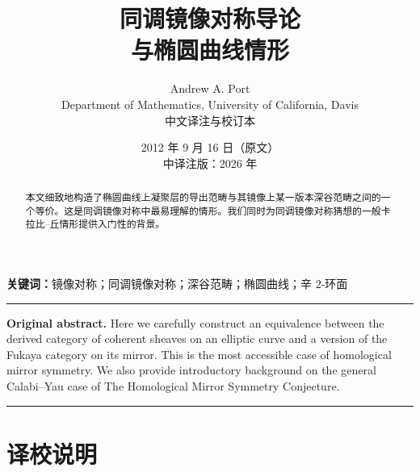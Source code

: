\documentclass[11pt,a4paper]{article}
\theoremstyle{plain}
\theoremstyle{definition}
\begin{document}
\title{\bfseries 同调镜像对称导论\\[4pt] 与椭圆曲线情形}
\author{Andrew A. Port\\[2pt]
        \small Department of Mathematics, University of California, Davis\\[6pt]
        \small 中文译注与校订本}
\date{2012 年 9 月 16 日（原文）\\[2pt] 中译注版：2026 年}
\maketitle

\begin{abstract}
本文细致地构造了椭圆曲线上凝聚层的导出范畴与其镜像上某一版本深谷范畴之间的一个等价。这是同调镜像对称中最易理解的情形。我们同时为同调镜像对称猜想的一般卡拉比–丘情形提供入门性的背景。
\end{abstract}

\noindent\textbf{关键词：}镜像对称；同调镜像对称；深谷范畴；椭圆曲线；辛 $2$-环面

\vspace{1.2em}
\noindent\rule{\linewidth}{0.4pt}
{\small
\noindent\textbf{Original abstract.} Here we carefully construct an equivalence between the derived
category of coherent sheaves on an elliptic curve and a version of the Fukaya category on its
mirror. This is the most accessible case of homological mirror symmetry. We also provide introductory
background on the general Calabi--Yau case of The Homological Mirror Symmetry Conjecture.\par}
\noindent\rule{\linewidth}{0.4pt}

\vspace{0.6em}
\section*{译校说明}
\end{document}
